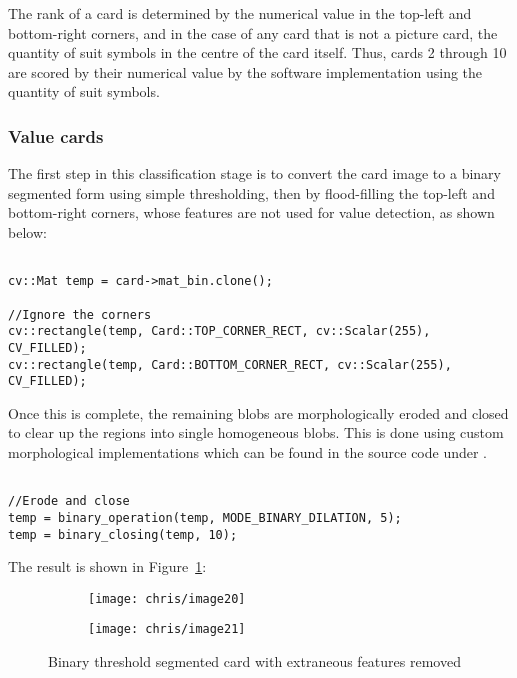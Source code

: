 		The rank of a card is determined by the numerical value in the top-left and bottom-right corners, and in the case of any card that is not a picture card, the quantity of suit symbols in the centre of the card itself. Thus, cards 2 through 10 are scored by their numerical value by the software implementation using the quantity of suit symbols.

		\subsubsection{Value cards}
			The first step in this classification stage is to convert the card image to a binary segmented form using simple thresholding, then by flood-filling the top-left and bottom-right corners, whose features are not used for value detection, as shown below:

			\begin{lstlisting}

cv::Mat temp = card->mat_bin.clone();

//Ignore the corners
cv::rectangle(temp, Card::TOP_CORNER_RECT, cv::Scalar(255), CV_FILLED);
cv::rectangle(temp, Card::BOTTOM_CORNER_RECT, cv::Scalar(255), CV_FILLED);
			\end{lstlisting}

			Once this is complete, the remaining blobs are morphologically eroded and closed to clear up the regions into single homogeneous blobs. This is done using custom morphological implementations which can be found in the source code under .

			\begin{lstlisting}

//Erode and close
temp = binary_operation(temp, MODE_BINARY_DILATION, 5);
temp = binary_closing(temp, 10);
			\end{lstlisting}

			The result is shown in Figure~\ref{fig:closing}:

			\begin{figure}[H]
				\centering
				\begin{subfigure}[b]{0.4\textwidth}
					\centering
					\texttt{[image: chris/image20]}
					\caption{}
				\end{subfigure}
				\begin{subfigure}[b]{0.4\textwidth}
					\centering
					\texttt{[image: chris/image21]}
					\caption{}
				\end{subfigure}
				\caption{Binary threshold segmented card with extraneous features removed}
				\label{fig:closing}
			\end{figure}

